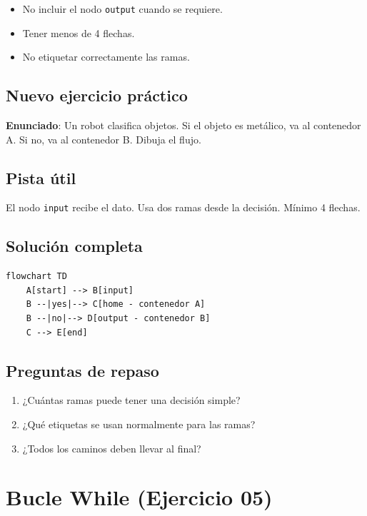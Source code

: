 \documentclass[12pt]{article}
\begin{document}
\begin{itemize}
    \item No incluir el nodo \texttt{output} cuando se requiere.
    \item Tener menos de 4 flechas.
    \item No etiquetar correctamente las ramas.
\end{itemize}

\subsection{Nuevo ejercicio práctico}

\textbf{Enunciado}: Un robot clasifica objetos. Si el objeto es metálico, va al contenedor A. Si no, va al contenedor B. Dibuja el flujo.

\subsection{Pista útil}

El nodo \texttt{input} recibe el dato. Usa dos ramas desde la decisión. Mínimo 4 flechas.

\subsection{Solución completa}

\begin{lstlisting}[style=mermaidstyle]
flowchart TD
    A[start] --> B[input]
    B --|yes|--> C[home - contenedor A]
    B --|no|--> D[output - contenedor B]
    C --> E[end]
\end{lstlisting}

\subsection{Preguntas de repaso}

\begin{enumerate}
    \item ¿Cuántas ramas puede tener una decisión simple?
    \item ¿Qué etiquetas se usan normalmente para las ramas?
    \item ¿Todos los caminos deben llevar al final?
\end{enumerate}

\newpage

\section{Bucle While (Ejercicio 05)}
\end{document}
